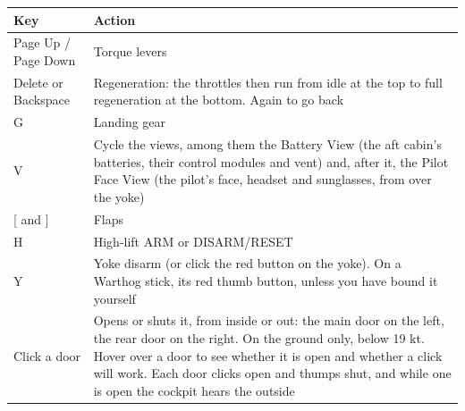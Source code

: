 \begin{tabularx}{\textwidth}{@{}l>{\raggedright\arraybackslash}X@{}}
\toprule
\textbf{Key} & \textbf{Action} \\
\midrule
Page Up / Page Down & Torque levers \\
Delete or Backspace & Regeneration: the throttles then run from idle at the top to full regeneration at the bottom. Again to go back \\
G & Landing gear \\
V & Cycle the views, among them the Battery View (the aft cabin's batteries, their control modules and vent) and, after it, the Pilot Face View (the pilot's face, headset and sunglasses, from over the yoke) \\
{}[ and ] & Flaps \\
H & High-lift ARM or DISARM/RESET \\
Y & Yoke disarm (or click the red button on the yoke). On a Warthog stick, its red thumb button, unless you have bound it yourself \\
Click a door & Opens or shuts it, from inside or out: the main door on the left, the rear door on the right. On the ground only, below 19 kt. Hover over a door to see whether it is open and whether a click will work. Each door clicks open and thumps shut, and while one is open the cockpit hears the outside \\
\bottomrule
\end{tabularx}
